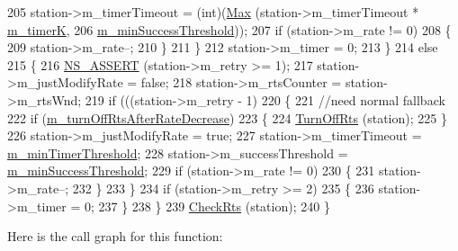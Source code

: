 \begin{DoxyCode}
205           station->m\_timerTimeout = (int)(\hyperlink{group__highprec_ga0d35bb9363c0da4cc2557158b95dbca0}{Max} (station->m\_timerTimeout * 
      \hyperlink{classns3_1_1AarfcdWifiManager_a0f41cac60afd7763f1dba44288e87db9}{m\_timerK},
206                                                \hyperlink{classns3_1_1AarfcdWifiManager_a5a7025c7463f7b1d003f9c3868018b8d}{m\_minSuccessThreshold}));
207           \textcolor{keywordflow}{if} (station->m\_rate != 0)
208             \{
209               station->m\_rate--;
210             \}
211         \}
212       station->m\_timer = 0;
213     \}
214   \textcolor{keywordflow}{else}
215     \{
216       \hyperlink{assert_8h_a6dccdb0de9b252f60088ce281c49d052}{NS\_ASSERT} (station->m\_retry >= 1);
217       station->m\_justModifyRate = \textcolor{keyword}{false};
218       station->m\_rtsCounter = station->m\_rtsWnd;
219       \textcolor{keywordflow}{if} (((station->m\_retry - 1) %
220         \{
221           \textcolor{comment}{//need normal fallback}
222           \textcolor{keywordflow}{if} (\hyperlink{classns3_1_1AarfcdWifiManager_a5ebefecf767771e0d858de09fdb5c264}{m\_turnOffRtsAfterRateDecrease})
223             \{
224               \hyperlink{classns3_1_1AarfcdWifiManager_a6d7efd473f4ea360b0f95895d91e5e1e}{TurnOffRts} (station);
225             \}
226           station->m\_justModifyRate = \textcolor{keyword}{true};
227           station->m\_timerTimeout = \hyperlink{classns3_1_1AarfcdWifiManager_a568403d4a1545d115fa70a262af60c66}{m\_minTimerThreshold};
228           station->m\_successThreshold = \hyperlink{classns3_1_1AarfcdWifiManager_a5a7025c7463f7b1d003f9c3868018b8d}{m\_minSuccessThreshold};
229           \textcolor{keywordflow}{if} (station->m\_rate != 0)
230             \{
231               station->m\_rate--;
232             \}
233         \}
234       \textcolor{keywordflow}{if} (station->m\_retry >= 2)
235         \{
236           station->m\_timer = 0;
237         \}
238     \}
239   \hyperlink{classns3_1_1AarfcdWifiManager_ae5874a6eb640c1873aa0f1b3da958be0}{CheckRts} (station);
240 \}
\end{DoxyCode}


Here is the call graph for this function\+:


